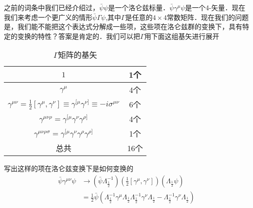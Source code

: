 
之前的词条中我们已经介绍过，$\bar \psi\psi$是一个洛仑兹标量．$\bar\psi\gamma^\mu\psi$是一个4-矢量．现在我们来考虑一个更广义的情形$\bar\psi\Gamma\psi$,其中$\Gamma$是任意的$4\times 4$常数矩阵．现在我们的问题是，我们能不能把这个表达式分解成一些项，这些项在洛仑兹群的变换下，具有特定的变换的特性？答案是肯定的．我们可以把$\Gamma$用下面这组基矢进行展开
\begin{table}[ht]
\centering
\caption{$\Gamma$矩阵的基矢}\label{diracm_tab1}
\begin{tabular}{|c|c|}
\hline
$1$ & 1个 \\
\hline
$\gamma^\mu$ & 4个 \\
\hline
$\gamma^{\mu\nu}=\frac{1}{2}[\gamma^\mu,\gamma^\nu]\equiv \gamma^{[\mu}\gamma^{\nu]}\equiv -i\sigma^{\mu\nu}$ & 6个 \\
\hline
$\gamma^{\mu\nu\rho}=\gamma^{[\mu}\gamma^\nu\gamma^{\rho]}$ & 4个 \\
\hline
$\gamma^{\mu\nu\rho\sigma}=\gamma^{[\mu}\gamma^\nu\gamma^\rho\gamma^{\rho]}$ & 1个 \\
\hline
总共 & 16个 \\
\hline
\end{tabular}
\end{table}
\begin{exercise}{写出这样的项在洛仑兹变换下是如何变换的}
\begin{align}\nonumber
\bar\psi\gamma^{\mu\nu}\psi & \rightarrow(\bar\psi\Lambda_{\frac{1}{2}}^{-1})(\frac{1}{2}[\gamma^\mu,\gamma^\nu])(\Lambda_{\frac{1}{2}}\psi)\\
& = \frac{1}{2} \bar\psi (\Lambda_{\frac{1}{2}}^{-1}\gamma^\mu\Lambda_{\frac{1}{2}}\Lambda_{\frac{1}{2}}^{-1}\gamma^\nu\Lambda_{\frac{1}{2}} - \Lambda_{\frac{1}{2}}^{-1}\gamma^\nu\Lambda_{\frac{1}{2}})
\end{align}
\end{exercise}


